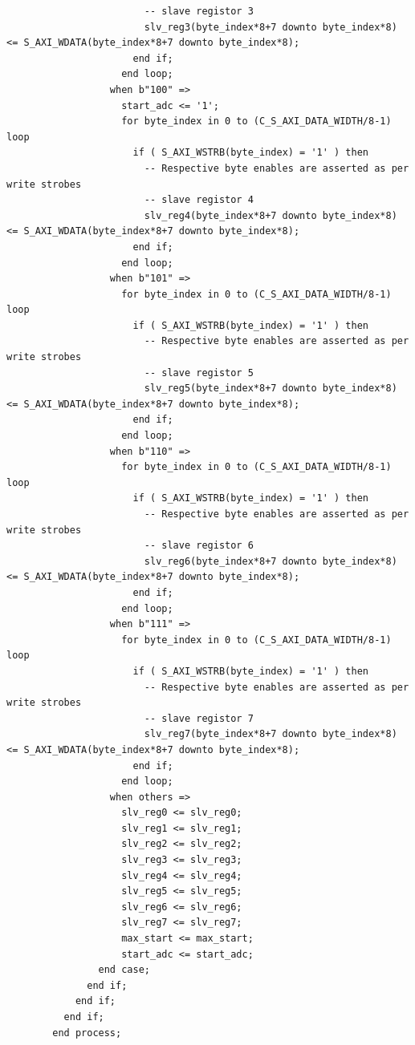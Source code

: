 \begin{verbatim}
                        -- slave registor 3
                        slv_reg3(byte_index*8+7 downto byte_index*8) <= S_AXI_WDATA(byte_index*8+7 downto byte_index*8);
                      end if;
                    end loop;
                  when b"100" =>
                    start_adc <= '1';
                    for byte_index in 0 to (C_S_AXI_DATA_WIDTH/8-1) loop
                      if ( S_AXI_WSTRB(byte_index) = '1' ) then
                        -- Respective byte enables are asserted as per write strobes                   
                        -- slave registor 4
                        slv_reg4(byte_index*8+7 downto byte_index*8) <= S_AXI_WDATA(byte_index*8+7 downto byte_index*8);
                      end if;
                    end loop;
                  when b"101" =>
                    for byte_index in 0 to (C_S_AXI_DATA_WIDTH/8-1) loop
                      if ( S_AXI_WSTRB(byte_index) = '1' ) then
                        -- Respective byte enables are asserted as per write strobes                   
                        -- slave registor 5
                        slv_reg5(byte_index*8+7 downto byte_index*8) <= S_AXI_WDATA(byte_index*8+7 downto byte_index*8);
                      end if;
                    end loop;
                  when b"110" =>
                    for byte_index in 0 to (C_S_AXI_DATA_WIDTH/8-1) loop
                      if ( S_AXI_WSTRB(byte_index) = '1' ) then
                        -- Respective byte enables are asserted as per write strobes                   
                        -- slave registor 6
                        slv_reg6(byte_index*8+7 downto byte_index*8) <= S_AXI_WDATA(byte_index*8+7 downto byte_index*8);
                      end if;
                    end loop;
                  when b"111" =>
                    for byte_index in 0 to (C_S_AXI_DATA_WIDTH/8-1) loop
                      if ( S_AXI_WSTRB(byte_index) = '1' ) then
                        -- Respective byte enables are asserted as per write strobes                   
                        -- slave registor 7
                        slv_reg7(byte_index*8+7 downto byte_index*8) <= S_AXI_WDATA(byte_index*8+7 downto byte_index*8);
                      end if;
                    end loop;
                  when others =>
                    slv_reg0 <= slv_reg0;
                    slv_reg1 <= slv_reg1;
                    slv_reg2 <= slv_reg2;
                    slv_reg3 <= slv_reg3;
                    slv_reg4 <= slv_reg4;
                    slv_reg5 <= slv_reg5;
                    slv_reg6 <= slv_reg6;
                    slv_reg7 <= slv_reg7;
                    max_start <= max_start;
                    start_adc <= start_adc;
                end case;
              end if;
            end if;
          end if;                   
        end process; 
    

\end{verbatim}
